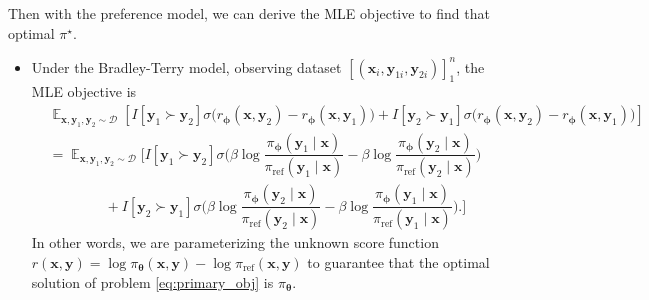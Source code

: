 \documentclass[10pt,xcolor={usenames,dvipsnames,table},aspectratio=169]{beamer}
\begin{document}
\begin{frame}
Then with the preference model, we can derive the MLE objective to find that optimal $\pi^{\star }$. 
\begin{itemize}
    \item Under the Bradley-Terry model, observing dataset $[(\bm{x}_i, \bm{y}_{1i}, \bm{y}_{2i})]_1^{n}$, the MLE objective is
\begin{align*}
    &\mathop{\mathbb{E}}_{\bm{x}, \bm{y}_1, \bm{y}_2 \sim \mathcal{D}} \left[ I[\bm{y}_1 \succ \bm{y}_2] \sigma \big(r_{\boldsymbol \phi}(\bm{x}, \bm{y}_2) - r_{\boldsymbol \phi}(\bm{x}, \bm{y}_1)\big) + I[\bm{y}_2 \succ \bm{y}_1] \sigma\big(r_{\boldsymbol \phi}(\bm{x}, \bm{y}_2) - r_{\boldsymbol \phi}(\bm{x}, \bm{y}_1)\big) \right] \\
    &= \mathop{\mathbb{E}}_{\bm{x}, \bm{y}_1, \bm{y}_2 \sim \mathcal{D}} \Big[  
         I[\bm{y}_1 \succ \bm{y}_2] \sigma \Big( \beta \log \dfrac{\pi_{\boldsymbol \phi }(\bm{y}_1 \mid \bm{x})}{\pi_{\text{ref}}(\bm{y}_1 \mid \bm{x})}  - \beta \log \dfrac{\pi_{\boldsymbol \phi }(\bm{y}_2 \mid \bm{x})}{\pi_{\text{ref}}(\bm{y}_2 \mid \bm{x})} \Big) \\
    &\quad \quad \quad \quad  + I[\bm{y}_2 \succ \bm{y}_1] \sigma \Big( \beta \log \dfrac{\pi_{\boldsymbol \phi }(\bm{y}_2 \mid \bm{x})}{\pi_{\text{ref}}(\bm{y}_2 \mid \bm{x})}  - \beta \log \dfrac{\pi_{\boldsymbol \phi }(\bm{y}_1 \mid \bm{x})}{\pi_{\text{ref}}(\bm{y}_1 \mid \bm{x})} \Big).
    \Big]
\end{align*}
In other words, we are parameterizing the unknown score function $r(\bm{x}, \bm{y}) = \log \pi_{\boldsymbol \theta}(\bm{x}, \bm{y}) - \log \pi_{\text{ref}}(\bm{x}, \bm{y})$ to guarantee that the optimal solution of problem \eqref{eq:primary_obj} is $\pi_{\boldsymbol \theta}$.

\end{itemize}

\end{frame}
\end{document}
